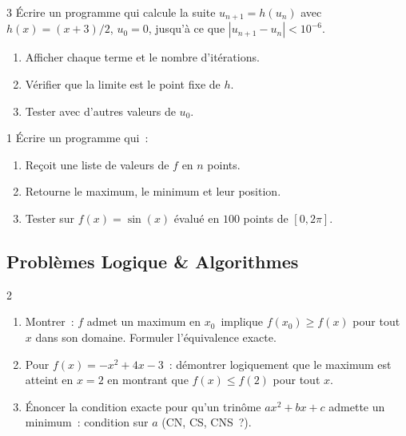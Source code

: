 \begin{exo}{3}
\'Ecrire un programme qui calcule la suite $u_{n+1}=h(u_n)$
avec $h(x)=(x+3)/2$, $u_0=0$, jusqu'\`a ce que $|u_{n+1}-u_n|<10^{-6}$.
\begin{enumerate}
  \item Afficher chaque terme et le nombre d'it\'erations.
  \item V\'erifier que la limite est le point fixe de $h$.
  \item Tester avec d'autres valeurs de $u_0$.
\end{enumerate}
\end{exo}

\begin{exo}{1}
\'Ecrire un programme qui~:
\begin{enumerate}
  \item Re\c coit une liste de valeurs de $f$ en $n$ points.
  \item Retourne le maximum, le minimum et leur position.
  \item Tester sur $f(x)=\sin(x)$ \'evalu\'e en $100$ points de $[0,2\pi]$.
\end{enumerate}
\end{exo}

\subsection*{Probl\`emes Logique \& Algorithmes}

\begin{probleme}{2}
\begin{enumerate}
  \item Montrer~: \og $f$ admet un maximum en $x_0$\fg\ implique
        \og $f(x_0)\geq f(x)$ pour tout $x$ dans son domaine\fg.
        Formuler l'\'equivalence exacte.
  \item Pour $f(x)=-x^2+4x-3$~: d\'emontrer logiquement que le maximum
        est atteint en $x=2$ en montrant que $f(x)\leq f(2)$ pour tout $x$.
  \item \'Enoncer la condition exacte pour qu'un trin\^ome $ax^2+bx+c$
        admette un minimum~: condition sur $a$ (CN, CS, CNS~?).
\end{enumerate}
\end{probleme}

